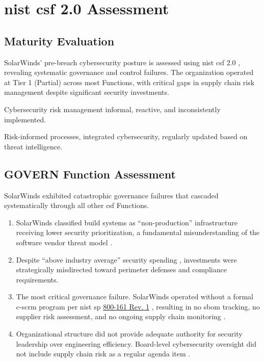 \section{\gls{nist} \gls{csf} 2.0 Assessment}
\label{sec:nist_csf}

\subsection{Maturity Evaluation}
SolarWinds' pre-breach cybersecurity posture is assessed using \gls{nist} \gls{csf} 2.0 \cite{pascoe2024}, revealing systematic governance and control failures. The organization operated at Tier 1 (Partial) across most Functions, with critical gaps in supply chain risk management despite significant security investments.

 Cybersecurity risk management informal, reactive, and inconsistently implemented.

 Risk-informed processes, integrated cybersecurity, regularly updated based on threat intelligence.

\subsection{GOVERN Function Assessment}
SolarWinds exhibited catastrophic governance failures that cascaded systematically through all other \gls{csf} Functions.

\begin{enumerate}
    \item {} SolarWinds classified build systems as ``non-production'' infrastructure receiving lower security prioritization, a fundamental misunderstanding of the software vendor threat model \cite{boyens2024}.
    \item {} Despite ``above industry average'' security spending \cite{nagle2023}, investments were strategically misdirected toward perimeter defenses and compliance requirements.
    \item {} The most critical governance failure. SolarWinds operated without a formal \gls{c-scrm} program per \gls{nist} \gls{sp} \href{https://csrc.nist.gov/pubs/sp/800/161/r1/upd1/final}{800-161 Rev. 1} \cite{boyens2024}, resulting in no \gls{sbom} tracking, no supplier risk assessment, and no ongoing supply chain monitoring \cite{boyens2024}.
    \item {} Organizational structure did not provide adequate authority for security leadership over engineering efficiency. Board-level cybersecurity oversight did not include supply chain risk as a regular agenda item \cite{nagle2023}.
\end{enumerate}

